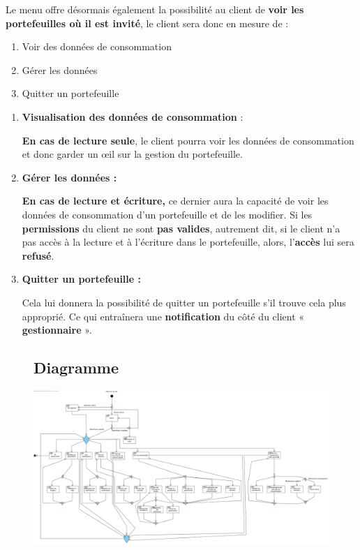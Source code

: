 \newpage

\begin{flushleft}
Le menu offre désormais également la possibilité au client de \textbf{voir les portefeuilles où il est invité}, le client sera donc en mesure de :
\end{flushleft}

\begin{enumerate}[1.]
\item Voir des données de consommation
\item Gérer les données
\item Quitter un portefeuille
\end{enumerate}

\begin{enumerate}[-]
\item \textbf{Visualisation des données de consommation} :

\textbf{En cas de lecture seule}, le client pourra voir les données de consommation et donc garder un œil sur la gestion du portefeuille.

\item \textbf{Gérer les données :}

\textbf{En cas de lecture et écriture,} ce dernier aura la capacité de voir les données de consommation d’un portefeuille et de les modifier.
\newline
Si les \textbf{permissions} du client ne sont \textbf{pas valides}, autrement dit, si le client n’a pas accès à la lecture et à l’écriture dans le portefeuille, alors, l’\textbf{accès} lui sera \textbf{refusé}.

\item \textbf{Quitter un portefeuille :}

Cela lui donnera la possibilité de quitter un portefeuille s’il trouve cela plus approprié.
\newline
Ce qui entraînera une \textbf{notification} du côté du client « \textbf{gestionnaire} ».

\end{enumerate}


\begin{figure}[h]
\subsection{Diagramme}
\centering
\includegraphics[width = 1\textwidth]{Extension-claire/Overview-claire/img/overview.png}
\end{figure}

